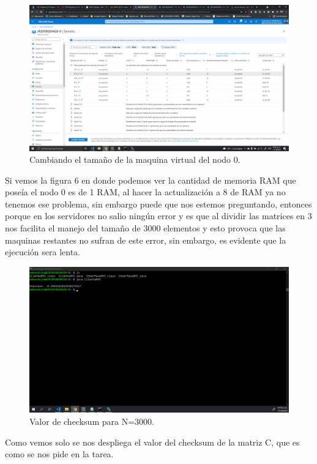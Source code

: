 \documentclass[11pt]{article}
\begin{document}
		\begin{figure}[H]
			\centering
			\includegraphics[scale=0.34]{resources/cambiandotama.png}
			\caption{Cambiando el tamaño de la maquina virtual del nodo 0.}\label{fig:picture}
		\end{figure}
		Si vemos la figura 6 en donde podemos ver la cantidad de memoria RAM que poseía el nodo 0 es de 1 RAM, al hacer la actualización a 8 de RAM ya no tenemos ese problema, sin embargo puede que nos estemos preguntando, entonces porque en los servidores no salio ningún error y es que al dividir las matrices en 3 nos facilita el manejo del tamaño de 3000 elementos y esto provoca que las maquinas restantes no sufran de este error, sin embargo, es evidente que la ejecución sera lenta.\par
		\begin{figure}[H]
			\centering
			\includegraphics[scale=0.34]{resources/resultado3000.png}
			\caption{Valor de checksum para N=3000.}\label{fig:picture}
		\end{figure}
		Como vemos solo se nos despliega el valor del checksum de la matriz C, que es como se nos pide en la tarea.
\end{document}
